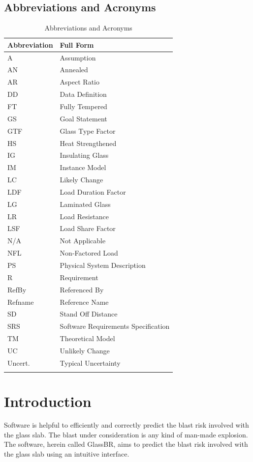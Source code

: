 \documentclass[12pt]{article}
\begin{document}
\subsection{Abbreviations and Acronyms}
\label{Sec:TAbbAcc}
\begin{longtable}{l l}
\toprule
\textbf{Abbreviation} & \textbf{Full Form}
\\
\midrule
\endhead
A & Assumption
\\
AN & Annealed
\\
AR & Aspect Ratio
\\
DD & Data Definition
\\
FT & Fully Tempered
\\
GS & Goal Statement
\\
GTF & Glass Type Factor
\\
HS & Heat Strengthened
\\
IG & Insulating Glass
\\
IM & Instance Model
\\
LC & Likely Change
\\
LDF & Load Duration Factor
\\
LG & Laminated Glass
\\
LR & Load Resistance
\\
LSF & Load Share Factor
\\
N/A & Not Applicable
\\
NFL & Non-Factored Load
\\
PS & Physical System Description
\\
R & Requirement
\\
RefBy & Referenced By
\\
Refname & Reference Name
\\
SD & Stand Off Distance
\\
SRS & Software Requirements Specification
\\
TM & Theoretical Model
\\
UC & Unlikely Change
\\
Uncert. & Typical Uncertainty
\\
\bottomrule
\caption{Abbreviations and Acronyms}
\label{Table:TAbbAcc}
\end{longtable}
\section{Introduction}
\label{Sec:Intro}
Software is helpful to efficiently and correctly predict the blast risk involved with the glass slab. The blast under consideration is any kind of man-made explosion. The software, herein called GlassBR, aims to predict the blast risk involved with the glass slab using an intuitive interface.
\end{document}
